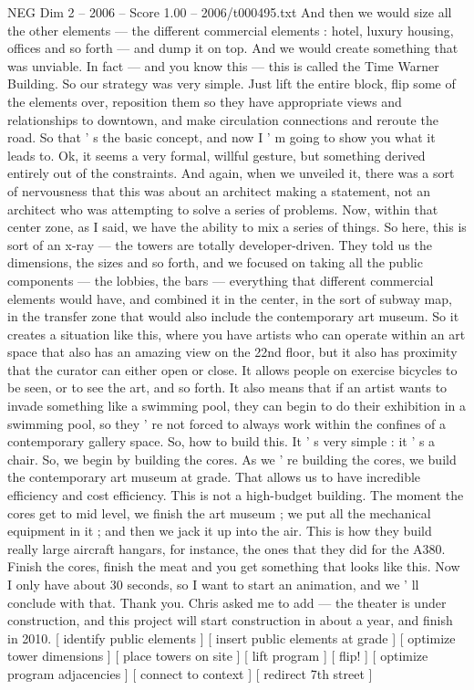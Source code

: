\begin{textsample}{NEG Dim 2 – 2006 – Score 1.00 – 2006/t000495.txt}
And then we would size all the other elements — the different commercial elements : hotel, luxury housing, offices and so forth — and dump it on top.
And we would create something that was unviable.
In fact — and you know this — this is called the Time Warner Building.
So our strategy was very simple.
Just lift the entire block, flip some of the elements over, reposition them so they have appropriate views and relationships to downtown, and make circulation connections and reroute the road.
So that ' s the basic concept, and now I ' m going to show you what it leads to.
Ok, it seems a very formal, willful gesture, but something derived entirely out of the constraints.
And again, when we unveiled it, there was a sort of nervousness that this was about an architect making a statement, not an architect who was attempting to solve a series of problems.
Now, within that center zone, as I said, we have the ability to mix a series of things.
So here, this is sort of an x-ray — the towers are totally developer-driven.
They told us the dimensions, the sizes and so forth, and we focused on taking all the public components — the lobbies, the bars — everything that different commercial elements would have, and combined it in the center, in the sort of subway map, in the transfer zone that would also include the contemporary art museum.
So it creates a situation like this, where you have artists who can operate within an art space that also has an amazing view on the 22nd floor, but it also has proximity that the curator can either open or close.
It allows people on exercise bicycles to be seen, or to see the art, and so forth.
It also means that if an artist wants to invade something like a swimming pool, they can begin to do their exhibition in a swimming pool, so they ' re not forced to always work within the confines of a contemporary gallery space.
So, how to build this.
It ' s very simple : it ' s a chair.
So, we begin by building the cores.
As we ' re building the cores, we build the contemporary art museum at grade.
That allows us to have incredible efficiency and cost efficiency.
This is not a high-budget building.
The moment the cores get to mid level, we finish the art museum ; we put all the mechanical equipment in it ; and then we jack it up into the air.
This is how they build really large aircraft hangars, for instance, the ones that they did for the A380.
Finish the cores, finish the meat and you get something that looks like this.
Now I only have about 30 seconds, so I want to start an animation, and we ' ll conclude with that.
Thank you.
Chris asked me to add — the theater is under construction, and this project will start construction in about a year, and finish in 2010. [ identify public elements ] [ insert public elements at grade ] [ optimize tower dimensions ] [ place towers on site ] [ lift program ] [ flip! ] [ optimize program adjacencies ] [ connect to context ] [ redirect 7th street ]

\end{textsample}
